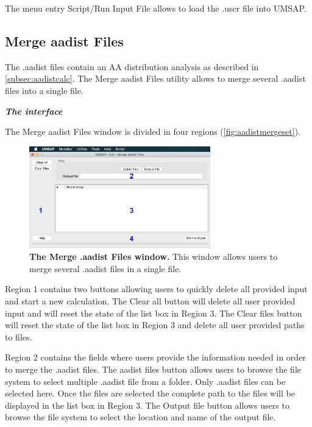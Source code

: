 The menu entry Script/Run Input File allows to load the .uscr file into UMSAP.

\subsection{Merge aadist Files}
\label{subsec:mergeaadistfiles}

The .aadist files contain an AA distribution analysis as described in \autoref{subsec:aadistcalc}. The Merge aadist Files utility allows to merge several .aadist files into a single file.

\textit{\textbf{The interface}}

The Merge aadist Files window is divided in four regions (\autoref{fig:aadistmergeset}).

\begin{figure}[h]
	\centering
	\includegraphics[width=0.7\textwidth]{./IMAGES/UTIL-Maadist-WINDOW/util-maadist.jpg}	    
	\caption[The Merge .aadist Files window]{\textbf{The Merge .aadist Files window.} This window allows users to merge several .aadist files in a single file.}
	\label{fig:aadistmergeset}
	\vspace{-5pt} 	
\end{figure}

Region \num{1} contains two buttons allowing users to quickly delete all provided input and start a new calculation. The Clear all button will delete all user provided input and will reset the state of the list box in Region \num{3}. The Clear files button will reset the state of the list box in Region \num{3} and delete all user provided paths to files.

Region \num{2} contains the fields where users provide the information needed in order to merge the .aadist files. The aadist files button allows users to browse the file system to select multiple .aadist file from a folder. Only .aadist files can be selected here. Once the files are selected the complete path to the files will be displayed in the list box in Region \num{3}. The Output file button allows users to browse the file system to select the location and name of the output file.


